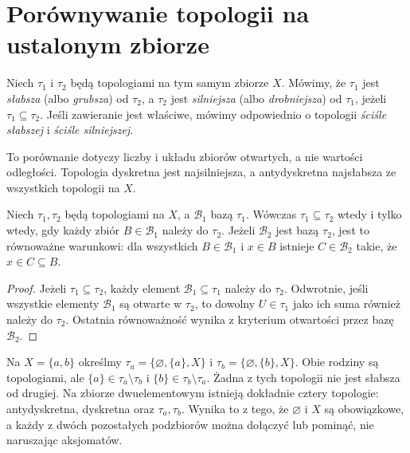 \section{Porównywanie topologii na ustalonym zbiorze}
\label{sec:topog-porownywanie}

\begin{definicja}
\label{def:topog-silniejsza}
Niech $\tau_1$ i $\tau_2$ będą topologiami na tym
samym zbiorze $X$. Mówimy, że $\tau_1$ jest
\emph{słabsza} (albo \emph{grubsza}) od $\tau_2$,
a $\tau_2$ jest \emph{silniejsza} (albo \emph{drobniejsza})
od $\tau_1$, jeżeli $\tau_1\subseteq\tau_2$.
Jeśli zawieranie jest właściwe, mówimy odpowiednio
o topologii \emph{ściśle słabszej} i \emph{ściśle silniejszej}.
\end{definicja}

To porównanie dotyczy liczby i układu zbiorów otwartych,
a nie wartości odległości. Topologia dyskretna jest
najsilniejsza, a antydyskretna najsłabsza ze wszystkich
topologii na $X$.

\begin{stwierdzenie}
\label{prop:topog-porownanie-bazy}
Niech $\tau_1,\tau_2$ będą topologiami na $X$,
a $\mathcal B_1$ bazą $\tau_1$.
Wówczas $\tau_1\subseteq\tau_2$ wtedy i tylko wtedy,
gdy każdy zbiór $B\in\mathcal B_1$ należy do $\tau_2$.
Jeżeli $\mathcal B_2$ jest bazą $\tau_2$, jest to
równoważne warunkowi: dla wszystkich $B\in\mathcal B_1$
i $x\in B$ istnieje $C\in\mathcal B_2$ takie,
że $x\in C\subseteq B$.
\end{stwierdzenie}
\begin{proof}
Jeżeli $\tau_1\subseteq\tau_2$, każdy element
$\mathcal B_1\subseteq\tau_1$ należy do $\tau_2$.
Odwrotnie, jeśli wszystkie elementy $\mathcal B_1$
są otwarte w $\tau_2$, to dowolny $U\in\tau_1$
jako ich suma również należy do $\tau_2$.
Ostatnia równoważność wynika z kryterium otwartości
przez bazę $\mathcal B_2$.
\end{proof}

\begin{przyklad}
\label{ex:topog-nieporownywalne}
Na $X=\{a,b\}$ określmy
$\tau_a=\{\varnothing,\{a\},X\}$ i
$\tau_b=\{\varnothing,\{b\},X\}$.
Obie rodziny są topologiami, ale
$\{a\}\in\tau_a\setminus\tau_b$ i
$\{b\}\in\tau_b\setminus\tau_a$.
Żadna z tych topologii nie jest słabsza od drugiej.
Na zbiorze dwuelementowym istnieją dokładnie cztery
topologie: antydyskretna, dyskretna oraz $\tau_a,\tau_b$.
Wynika to z tego, że $\varnothing$ i $X$ są obowiązkowe,
a każdy z dwóch pozostałych podzbiorów można dołączyć
lub pominąć, nie naruszając aksjomatów.
\end{przyklad}

